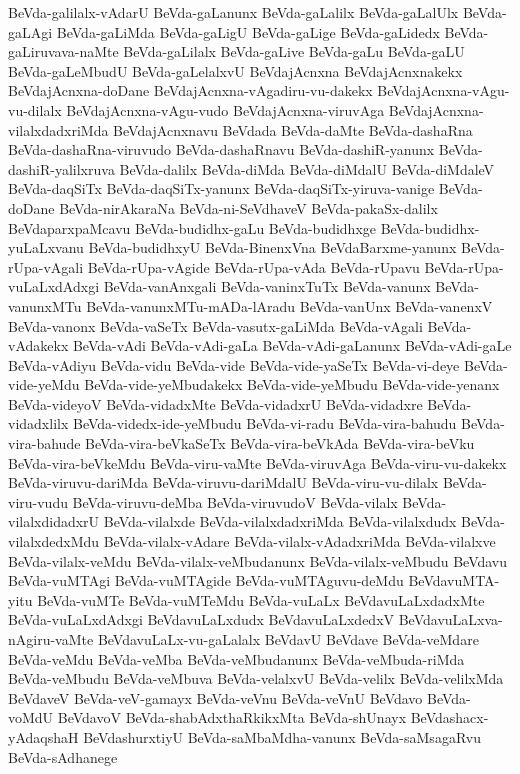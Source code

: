 {BeVda-galilalx-vAdarU
BeVda-gaLanunx
BeVda-gaLalilx
BeVda-gaLalUlx
BeVda-gaLAgi
BeVda-gaLiMda
BeVda-gaLigU
BeVda-gaLige
BeVda-gaLidedx
BeVda-gaLiruvava-naMte
BeVda-gaLilalx
BeVda-gaLive
BeVda-gaLu
BeVda-gaLU
BeVda-gaLeMbudU
BeVda-gaLelalxvU
BeVdajAcnxna
BeVdajAcnxnakekx
BeVdajAcnxna-doDane
BeVdajAcnxna-vAgadiru-vu-dakekx
BeVdajAcnxna-vAgu-vu-dilalx
BeVdajAcnxna-vAgu-vudo
BeVdajAcnxna-viruvAga
BeVdajAcnxna-vilalxdadxriMda
BeVdajAcnxnavu
BeVdada
BeVda-daMte
BeVda-dashaRna
BeVda-dashaRna-viruvudo
BeVda-dashaRnavu
BeVda-dashiR-yanunx
BeVda-dashiR-yalilxruva
BeVda-dalilx
BeVda-diMda
BeVda-diMdalU
BeVda-diMdaleV
BeVda-daqSiTx
BeVda-daqSiTx-yanunx
BeVda-daqSiTx-yiruva-vanige
BeVda-doDane
BeVda-nirAkaraNa
BeVda-ni-SeVdhaveV
BeVda-pakaSx-dalilx
BeVdaparxpaMcavu
BeVda-budidhx-gaLu
BeVda-budidhxge
BeVda-budidhx-yuLaLxvanu
BeVda-budidhxyU
BeVda-BinenxVna
BeVdaBarxme-yanunx
BeVda-rUpa-vAgali
BeVda-rUpa-vAgide
BeVda-rUpa-vAda
BeVda-rUpavu
BeVda-rUpa-vuLaLxdAdxgi
BeVda-vanAnxgali
BeVda-vaninxTuTx
BeVda-vanunx
BeVda-vanunxMTu
BeVda-vanunxMTu-mADa-lAradu
BeVda-vanUnx
BeVda-vanenxV
BeVda-vanonx
BeVda-vaSeTx
BeVda-vasutx-gaLiMda
BeVda-vAgali
BeVda-vAdakekx
BeVda-vAdi
BeVda-vAdi-gaLa
BeVda-vAdi-gaLanunx
BeVda-vAdi-gaLe
BeVda-vAdiyu
BeVda-vidu
BeVda-vide
BeVda-vide-yaSeTx
BeVda-vi-deye
BeVda-vide-yeMdu
BeVda-vide-yeMbudakekx
BeVda-vide-yeMbudu
BeVda-vide-yenanx
BeVda-videyoV
BeVda-vidadxMte
BeVda-vidadxrU
BeVda-vidadxre
BeVda-vidadxlilx
BeVda-videdx-ide-yeMbudu
BeVda-vi-radu
BeVda-vira-bahudu
BeVda-vira-bahude
BeVda-vira-beVkaSeTx
BeVda-vira-beVkAda
BeVda-vira-beVku
BeVda-vira-beVkeMdu
BeVda-viru-vaMte
BeVda-viruvAga
BeVda-viru-vu-dakekx
BeVda-viruvu-dariMda
BeVda-viruvu-dariMdalU
BeVda-viru-vu-dilalx
BeVda-viru-vudu
BeVda-viruvu-deMba
BeVda-viruvudoV
BeVda-vilalx
BeVda-vilalxdidadxrU
BeVda-vilalxde
BeVda-vilalxdadxriMda
BeVda-vilalxdudx
BeVda-vilalxdedxMdu
BeVda-vilalx-vAdare
BeVda-vilalx-vAdadxriMda
BeVda-vilalxve
BeVda-vilalx-veMdu
BeVda-vilalx-veMbudanunx
BeVda-vilalx-veMbudu
BeVdavu
BeVda-vuMTAgi
BeVda-vuMTAgide
BeVda-vuMTAguvu-deMdu
BeVdavuMTA-yitu
BeVda-vuMTe
BeVda-vuMTeMdu
BeVda-vuLaLx
BeVdavuLaLxdadxMte
BeVda-vuLaLxdAdxgi
BeVdavuLaLxdudx
BeVdavuLaLxdedxV
BeVdavuLaLxva-nAgiru-vaMte
BeVdavuLaLx-vu-gaLalalx
BeVdavU
BeVdave
BeVda-veMdare
BeVda-veMdu
BeVda-veMba
BeVda-veMbudanunx
BeVda-veMbuda-riMda
BeVda-veMbudu
BeVda-veMbuva
BeVda-velalxvU
BeVda-velilx
BeVda-velilxMda
BeVdaveV
BeVda-veV-gamayx
BeVda-veVnu
BeVda-veVnU
BeVdavo
BeVda-voMdU
BeVdavoV
BeVda-shabAdxthaRkikxMta
BeVda-shUnayx
BeVdashacx-yAdaqshaH
BeVdashurxtiyU
BeVda-saMbaMdha-vanunx
BeVda-saMsagaRvu
BeVda-sAdhanege
}
